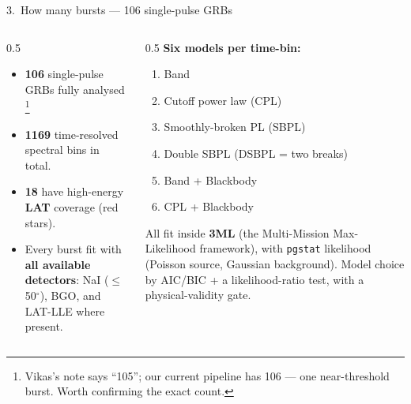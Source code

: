 \documentclass[aspectratio=169,11pt]{beamer}
\begin{document}
\begin{frame}{3.\ How many bursts --- 106 single-pulse GRBs}
\begin{columns}
\begin{column}{0.5\textwidth}
\small
\begin{itemize}
  \item \textbf{106} single-pulse GRBs fully analysed
        \footnote{\scriptsize Vikas's note says ``105''; our current pipeline
        has 106 --- one near-threshold burst. Worth confirming the exact count.}
  \item \textbf{1169} time-resolved spectral bins in total.
  \item \textbf{18} have high-energy \textbf{LAT} coverage (red stars).
  \item Every burst fit with \textbf{all available detectors}: NaI ($\le$50$^\circ$),
        BGO, and LAT-LLE where present.
\end{itemize}
\end{column}
\begin{column}{0.5\textwidth}
\small
\textbf{Six models per time-bin:}
\begin{enumerate}\scriptsize
  \item Band
  \item Cutoff power law (CPL)
  \item Smoothly-broken PL (SBPL)
  \item Double SBPL (DSBPL = two breaks)
  \item Band + Blackbody
  \item CPL + Blackbody
\end{enumerate}
\medskip
All fit inside \textbf{3ML} (the Multi-Mission Max-Likelihood framework), with
\texttt{pgstat} likelihood (Poisson source, Gaussian background). Model choice by
AIC/BIC + a likelihood-ratio test, with a physical-validity gate.
\end{column}
\end{columns}
\end{frame}

\end{document}
